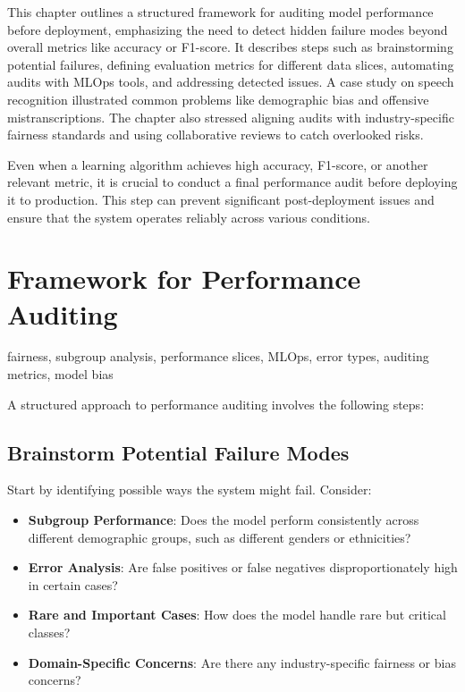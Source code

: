 \documentclass[12pt,openany]{book}
\begin{document}
\begin{examplebox} 
This chapter outlines a structured framework for auditing model performance before deployment, emphasizing the need to detect hidden failure modes beyond overall metrics like accuracy or F1-score. It describes steps such as brainstorming potential failures, defining evaluation metrics for different data slices, automating audits with MLOps tools, and addressing detected issues. A case study on speech recognition illustrated common problems like demographic bias and offensive mistranscriptions. The chapter also stressed aligning audits with industry-specific fairness standards and using collaborative reviews to catch overlooked risks. 
\end{examplebox}

Even when a learning algorithm achieves high accuracy, F1-score, or another relevant metric, it is crucial to conduct a final performance audit before deploying it to production. This step can prevent significant post-deployment issues and ensure that the system operates reliably across various conditions. 



\section{Framework for Performance Auditing}

\begin{keywordsbox}
fairness, subgroup analysis, performance slices, MLOps, error types, auditing metrics, model bias
\end{keywordsbox}

A structured approach to performance auditing involves the following steps:

\subsection{Brainstorm Potential Failure Modes}
Start by identifying possible ways the system might fail. Consider:
\begin{itemize}
    \item \textbf{Subgroup Performance}: Does the model perform consistently across different demographic groups, such as different genders or ethnicities?
    \item \textbf{Error Analysis}: Are false positives or false negatives disproportionately high in certain cases?
    \item \textbf{Rare and Important Cases}: How does the model handle rare but critical classes?
    \item \textbf{Domain-Specific Concerns}: Are there any industry-specific fairness or bias concerns?
\end{itemize}
\end{document}
